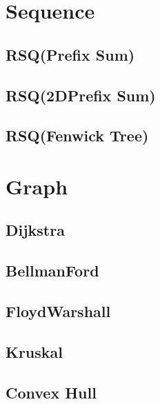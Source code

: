 \section{Sequence}

\subsection{RSQ(Prefix Sum)}


\subsection{RSQ(2DPrefix Sum)}


\subsection{RSQ(Fenwick Tree)}

\section{Graph}

\subsection{Dijkstra}


\subsection{BellmanFord}


\subsection{FloydWarshall}


\subsection{Kruskal}


\subsection{Convex Hull}



